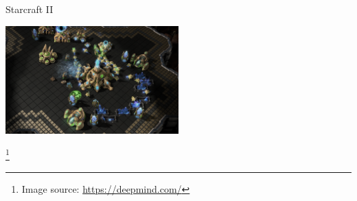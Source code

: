 \begin{frame}[c]{Starcraft II }
	
	\centering
	\includegraphics[width=0.5\textwidth]{images/starcraftii.png}
	
\footnote{Image source: \url{https://deepmind.com/}}
	
\end{frame}

